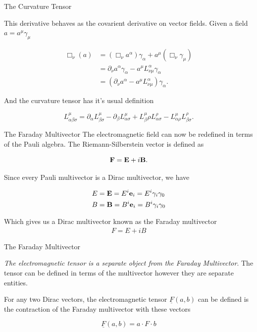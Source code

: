 \documentclass{beamer}
\begin{document}
\begin{frame}{The Curvature Tensor}

This derivative behaves as the covarient derivative on vector fields. Given a field $a = a^\mu\gamma_\mu$

\begin{align*}
	\Box_\nu (a) &= (\Box_\nu a^\alpha) \gamma_\alpha + a^\mu (\Box_\nu \gamma_\mu) \\
	&= \partial_\nu a^\alpha \gamma_\alpha - a^\mu L^\alpha_{\nu\mu} \gamma_\alpha \\
	&= (\partial_\nu a^\alpha - a^\mu L^\alpha_{\nu\mu}) \gamma_\alpha.
\end{align*}

And the curvature tensor has it's usual definition

\begin{equation}
	L^\mu_{\alpha\beta\sigma} = \partial_\alpha L^\mu_{\beta\sigma} - \partial_\beta L^\mu_{\alpha\sigma} + L^\mu_\beta\rho L^\rho_{\alpha\sigma} - L^{\mu}_{\alpha\rho}L^\rho_{\beta\sigma}.
\end{equation}

\end{frame}

\begin{frame}{The Faraday Multivector}
The electromagnetic field can now be redefined in terms of the Pauli algebra. The Riemann-Silberstein vector is defined as

\begin{equation}
	\vb F = \vb E + i\vb B.
\end{equation}

\pause
Since every Pauli multivector is a Dirac multivector, we have

\begin{align}
	E &= \vb E = E^i \vb e_i = E^i \gamma_i\gamma_0 \\
	B &= \vb B = B^i \vb e_i = B^i \gamma_i\gamma_0
\end{align}

Which gives us a Dirac multivector known as the Faraday multivector
\begin{align}
	F = E + iB
\end{align}

\end{frame}

\begin{frame}{The Faraday Multivector}

\emph{The electromagnetic tensor is a separate object from the Faraday Multivector}. The tensor can be defined in terms of the multivector however they are separate entities.

\pause

For any two Dirac vectors, the electromagnetic tensor $\underline{F}(a, b)$ can be defined is the contraction of the Faraday multivector with these vectors

\begin{equation}
	\underline{F}(a, b) = a \cdot F \cdot b
\end{equation}

\end{frame}
\end{document}
